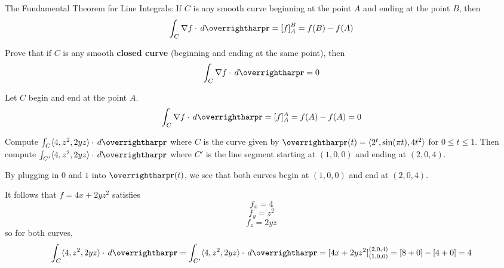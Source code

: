 \documentclass[letterpaper, twoside, 12pt]{book}
\begin{document}
\begin{theorem}
  The Fundamental Theorem for Line Integrals:
  If $C$ is any smooth curve beginning at the point $A$ and ending at the
  point $B$, then
  \[
    \int_C \nabla f\cdot \dvar{\vect{r}} = \left[f\right]_A^B = f(B)-f(A)
  \]
\end{theorem}

          \begin{problem}
            Prove that if $C$ is any smooth \textbf{closed curve}
            (beginning and ending at the same point), then
            \[
              \int_C \nabla f\cdot \dvar{\vect{r}} = 0
            \]
          \end{problem}

          \begin{solution}
            Let \(C\) begin and end at the point \(A\).
            \[
              \int_C \nabla f\cdot \dvar{\vect{r}}
                =
              [f]_A^A
                =
              f(A)-f(A)
                =
              0
            \]
          \end{solution}

          \begin{problem}
            Compute $\int_C\<4,z^2,2yz\>\cdot\dvar{\vect r}$ where
            $C$ is the curve given by
            $\vect{r}(t)=\<2^t,\sin (\pi t),4t^2\>$ for $0\leq t\leq 1$.
            Then compute $\int_{C'}\<4,z^2,2yz\>\cdot\dvar{\vect r}$ where
            $C'$ is the line segment starting at $(1,0,0)$ and ending
            at $(2,0,4)$.
          \end{problem}

          \begin{solution}
            By plugging in \(0\) and \(1\) into \(\vect{r}(t)\),
            we see that both curves begin at \((1,0,0)\) and end at
            \((2,0,4)\).

            It follows that \(f=4x+2yz^2\) satisfies
              \[
                f_x=4
              \]
              \[
                f_y=z^2
              \]
              \[
                f_z=2yz
              \]
            so for both curves,
              \[
                \int_C\<4,z^2,2yz\>\cdot\dvar{\vect r}
                  =
                \int_{C'}\<4,z^2,2yz\>\cdot\dvar{\vect r}
                  =
                [4x+2yz^2]_{(1,0,0)}^{(2,0,4)}
                  =
                [8+0]-[4+0]
                  =
                4
              \]
          \end{solution}
\end{document}
